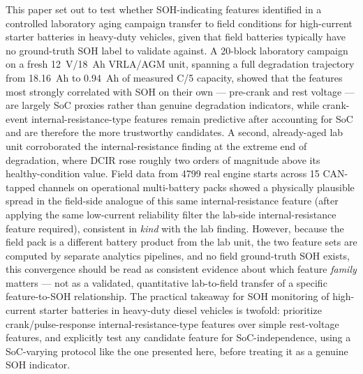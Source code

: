\documentclass[conference]{IEEEtran}
\begin{document}
This paper set out to test whether SOH-indicating features identified in a controlled laboratory aging campaign transfer to field conditions for high-current starter batteries in heavy-duty vehicles, given that field batteries typically have no ground-truth SOH label to validate against. A 20-block laboratory campaign on a fresh 12~V/18~Ah VRLA/AGM unit, spanning a full degradation trajectory from 18.16~Ah to 0.94~Ah of measured C/5 capacity, showed that the features most strongly correlated with SOH on their own --- pre-crank and rest voltage --- are largely SoC proxies rather than genuine degradation indicators, while crank-event internal-resistance-type features remain predictive after accounting for SoC and are therefore the more trustworthy candidates. A second, already-aged lab unit corroborated the internal-resistance finding at the extreme end of degradation, where DCIR rose roughly two orders of magnitude above its healthy-condition value. Field data from 4799 real engine starts across 15 CAN-tapped channels on operational multi-battery packs showed a physically plausible spread in the field-side analogue of this same internal-resistance feature (after applying the same low-current reliability filter the lab-side internal-resistance feature required), consistent in \emph{kind} with the lab finding. However, because the field pack is a different battery product from the lab unit, the two feature sets are computed by separate analytics pipelines, and no field ground-truth SOH exists, this convergence should be read as consistent evidence about which feature \emph{family} matters --- not as a validated, quantitative lab-to-field transfer of a specific feature-to-SOH relationship. The practical takeaway for SOH monitoring of high-current starter batteries in heavy-duty diesel vehicles is twofold: prioritize crank/pulse-response internal-resistance-type features over simple rest-voltage features, and explicitly test any candidate feature for SoC-independence, using a SoC-varying protocol like the one presented here, before treating it as a genuine SOH indicator.



\end{document}
